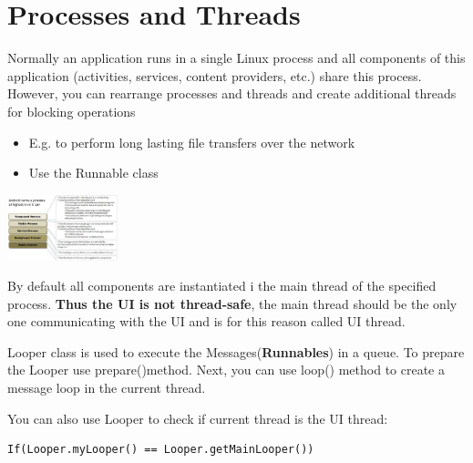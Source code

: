 \section{Processes and Threads}

\begin{breakbox}
Normally an application runs in a single Linux process and all
components of this application (activities, services, content providers,
etc.) share this process. However, you can rearrange processes and threads and create additional threads for blocking operations

\begin{itemize}
    \item E.g. to perform long lasting file transfers over the network
    \item Use the Runnable class
\end{itemize}
\end{breakbox}

\begin{breakbox}

\includegraphics[width=0.24\textwidth]{figures/processImportance.png}

\end{breakbox}

\begin{breakbox}

By default all components are instantiated i the main thread of the
specified process. \textbf{Thus the UI is not thread-safe}, the main
thread should be the only one communicating with the UI and is for this
reason called UI thread.

\end{breakbox}

\columnbreak
\begin{breakbox}

Looper class is used to execute the Messages(\textbf{Runnables}) in a
queue. To prepare the Looper use prepare()method. Next, you can use
loop() method to create a message loop in the current thread.

You can also use Looper to check if current thread is the UI thread:

\begin{lstlisting}
If(Looper.myLooper() == Looper.getMainLooper())
\end{lstlisting}
\end{breakbox}
